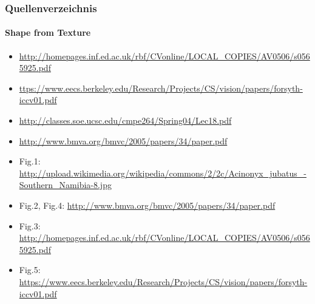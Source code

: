\documentclass{beamer}
\begin{document}
\begin{frame}
	\frametitle{Quellenverzeichnis}
	\framesubtitle{Shape from Texture}
	
	\begin{tiny}
	\begin{itemize}
	\item \href{http://homepages.inf.ed.ac.uk/rbf/CVonline/LOCAL_COPIES/AV0506/s0565925.pdf}{http://homepages.inf.ed.ac.uk/rbf/CVonline/LOCAL\_COPIES/AV0506/s0565925.pdf}
	\item \href{https://www.eecs.berkeley.edu/Research/Projects/CS/vision/papers/forsyth-iccv01.pdf}{ttps://www.eecs.berkeley.edu/Research/Projects/CS/vision/papers/forsyth-iccv01.pdf}
	\item \href{http://classes.soe.ucsc.edu/cmpe264/Spring04/Lec18.pdf}{http://classes.soe.ucsc.edu/cmpe264/Spring04/Lec18.pdf}
	\item \href{http://www.bmva.org/bmvc/2005/papers/34/paper.pdf}{http://www.bmva.org/bmvc/2005/papers/34/paper.pdf}
	\end{itemize}
	\begin{itemize}
	\item Fig.1: \href{http://upload.wikimedia.org/wikipedia/commons/2/2c/Acinonyx_jubatus_-Southern_Namibia-8.jpg}{http://upload.wikimedia.org/wikipedia/commons/2/2c/Acinonyx\_jubatus\_-Southern\_Namibia-8.jpg}
	\item Fig.2, Fig.4: \href{http://www.bmva.org/bmvc/2005/papers/34/paper.pdf}{http://www.bmva.org/bmvc/2005/papers/34/paper.pdf}
	\item Fig.3: \href{http://homepages.inf.ed.ac.uk/rbf/CVonline/LOCAL_COPIES/AV0506/s0565925.pdf}{http://homepages.inf.ed.ac.uk/rbf/CVonline/LOCAL\_COPIES/AV0506/s0565925.pdf}
	\item Fig.5: \href{https://www.eecs.berkeley.edu/Research/Projects/CS/vision/papers/forsyth-iccv01.pdf}{https://www.eecs.berkeley.edu/Research/Projects/CS/vision/papers/forsyth-iccv01.pdf}
	\end{itemize}
	\end{tiny}
\end{frame}



\end{document}
